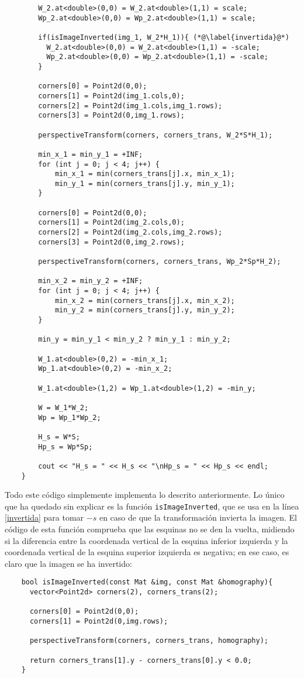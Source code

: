 \documentclass[a4paper, 11pt]{article}
\theoremstyle{definition}
\begin{document}
\begin{lstlisting}
        W_2.at<double>(0,0) = W_2.at<double>(1,1) = scale;
        Wp_2.at<double>(0,0) = Wp_2.at<double>(1,1) = scale;

        if(isImageInverted(img_1, W_2*H_1)){ (*@\label{invertida}@*)
          W_2.at<double>(0,0) = W_2.at<double>(1,1) = -scale;
          Wp_2.at<double>(0,0) = Wp_2.at<double>(1,1) = -scale;
        }

        corners[0] = Point2d(0,0);
        corners[1] = Point2d(img_1.cols,0);
        corners[2] = Point2d(img_1.cols,img_1.rows);
        corners[3] = Point2d(0,img_1.rows);

        perspectiveTransform(corners, corners_trans, W_2*S*H_1);

        min_x_1 = min_y_1 = +INF;
        for (int j = 0; j < 4; j++) {
            min_x_1 = min(corners_trans[j].x, min_x_1);
            min_y_1 = min(corners_trans[j].y, min_y_1);
        }

        corners[0] = Point2d(0,0);
        corners[1] = Point2d(img_2.cols,0);
        corners[2] = Point2d(img_2.cols,img_2.rows);
        corners[3] = Point2d(0,img_2.rows);

        perspectiveTransform(corners, corners_trans, Wp_2*Sp*H_2);

        min_x_2 = min_y_2 = +INF;
        for (int j = 0; j < 4; j++) {
            min_x_2 = min(corners_trans[j].x, min_x_2);
            min_y_2 = min(corners_trans[j].y, min_y_2);
        }

        min_y = min_y_1 < min_y_2 ? min_y_1 : min_y_2;

        W_1.at<double>(0,2) = -min_x_1;
        Wp_1.at<double>(0,2) = -min_x_2;

        W_1.at<double>(1,2) = Wp_1.at<double>(1,2) = -min_y;

        W = W_1*W_2;
        Wp = Wp_1*Wp_2;

        H_s = W*S;
        Hp_s = Wp*Sp;

        cout << "H_s = " << H_s << "\nHp_s = " << Hp_s << endl;
    }
    \end{lstlisting}

    Todo este código simplemente implementa lo descrito anteriormente. Lo único que ha quedado sin explicar es la función \lstinline{isImageInverted}, que se usa en la línea \ref{invertida} para tomar $-s$ en caso de que la transformación invierta la imagen. El código de esta función comprueba que las esquinas no se den la vuelta, midiendo si la diferencia entre la coordenada vertical de la esquina inferior izquierda y la coordenada vertical de la esquina superior izquierda es negativa; en ese caso, es claro que la imagen se ha invertido:
    \begin{lstlisting}
    bool isImageInverted(const Mat &img, const Mat &homography){
      vector<Point2d> corners(2), corners_trans(2);

      corners[0] = Point2d(0,0);
      corners[1] = Point2d(0,img.rows);

      perspectiveTransform(corners, corners_trans, homography);

      return corners_trans[1].y - corners_trans[0].y < 0.0;
    }
    \end{lstlisting}
\end{document}
